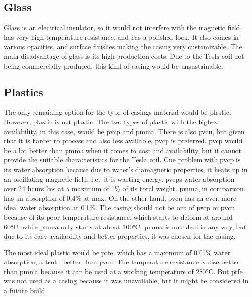 \subsection{Glass}

Glass is an electrical insulator, so it would not interfere with the magnetic field, has very high-temperature resistance, and has a polished look. It also comes in various opacities, and surface finishes making the casing very customizable. The main disadvantage of glass is its high production costs. Due to the Tesla coil not being commercially produced, this kind of casing would be unsustainable.

\subsection{Plastics}

The only remaining option for the type of casings material would be plastic. However, plastic is not plastic. The two types of plastic with the highest availability, in this case, would be \gls{pvcp} and \gls{pmma}. There is also \gls{pvcu}, but given that it is harder to process and also less available, \gls{pvcp} is preferred. \gls{pvcp} would be a lot better than \gls{pmma} when it comes to cost and availability, but it cannot provide the suitable characteristics for the Tesla coil. One problem with \gls{pvcp} is its water absorption because due to water's diamagnetic properties, it heats up in an oscillating magnetic field, i.e., it is wasting energy. \gls{pvcp}s water absorption over 24 hours lies at a maximum of 1\% of its total weight. \gls{pmma}, in comparison, has an absorption of 0.4\% at max. On the other hand, \gls{pvcu} has an even more ideal water absorption at 0.1\%.  The casing should not be out of \gls{pvcp} or \gls{pvcu} because of its poor temperature resistance, which starts to deform at around 60°C, while \gls{pmma} only starts at about 100°C. \gls{pmma} is not ideal in any way, but due to its easy availability and better properties, it was chosen for the casing. 

The most ideal plastic would be \gls{ptfe}, which has a maximum of 0.01\% water absorption, a tenth better than \gls{pvcu}. The temperature resistance is also better than \gls{pmma} because it can be used at a working temperature of 280°C. But \gls{ptfe} was not used as a casing because it was unavailable, but it might be considered in a future build.  

